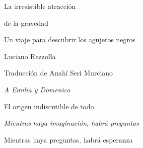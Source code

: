 \begin{titlepage}
\centering
\vspace*{2cm}
{\Huge La irresistible atracción\par de la gravedad\par}
\vspace{1cm}
{\Large Un viaje para descubrir los agujeros negros\par}
\vspace{2cm}
{\Large Luciano Rezzolla\par}
\vfill
Traducción de Anahí Seri Murciano\par
\end{titlepage}
\clearpage
\thispagestyle{empty}
\vspace*{3cm}
\begin{center}\itshape
A Emilia y Domenico\par
El origen indiscutible de todo\par
\end{center}
\clearpage
\thispagestyle{empty}
\vspace*{3cm}
\begin{center}\itshape
Mientras haya imaginación, habrá preguntas\par
Mientras haya preguntas, habrá esperanza\par
\end{center}
\clearpage
